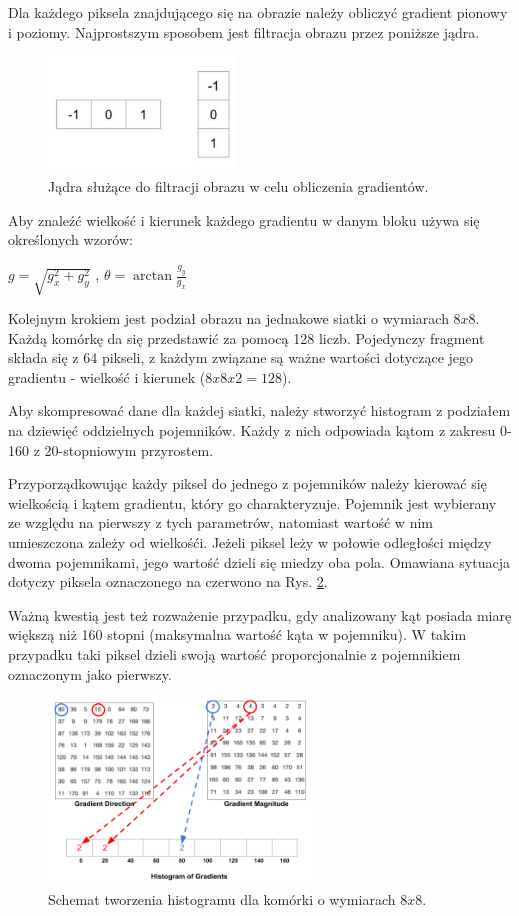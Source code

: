 Dla każdego piksela znajdującego się na obrazie należy obliczyć gradient pionowy i poziomy. Najprostszym sposobem jest filtracja obrazu przez poniższe jądra.

\begin{figure}[h]
	\centering
	\includegraphics[width=5cm]{hog-kernels.jpg}
	\caption{Jądra służące do filtracji obrazu w celu obliczenia gradientów.} 
	\label{fig:hogKernels}
\end{figure}

Aby znaleźć wielkość i kierunek każdego gradientu w danym bloku używa się określonych wzorów:
\begin{center}
    $g=\sqrt{g_{x}^{2}+g_{y}^{2}}$ ,
    $\theta=\arctan \frac{g_{y}}{g_{x}}$
\end{center}

Kolejnym krokiem jest podział obrazu na jednakowe siatki o wymiarach $8x8$. Każdą komórkę da się przedstawić za pomocą 128 liczb. Pojedynczy fragment składa się z 64 pikseli, z każdym związane są ważne wartości dotyczące jego gradientu - wielkość i kierunek ($8x8x2 = 128$). 

Aby skompresować dane dla każdej siatki, należy stworzyć histogram z podziałem na dziewięć oddzielnych pojemników. Każdy z nich odpowiada kątom z zakresu 0-160 z 20-stopniowym przyrostem.

Przyporządkowując każdy piksel do jednego z pojemników należy kierować się wielkością i kątem gradientu, który go charakteryzuje. Pojemnik jest wybierany ze względu na pierwszy z tych parametrów, natomiast wartość w nim umieszczona zależy od wielkośći. Jeżeli piksel leży w połowie odległości między dwoma pojemnikami, jego wartość dzieli się miedzy oba pola. Omawiana sytuacja dotyczy piksela oznaczonego na czerwono na Rys. \ref{fig:gradientHistogram}. 

Ważną kwestią jest też rozważenie przypadku, gdy analizowany kąt posiada miarę większą niż 160 stopni (maksymalna wartość kąta w pojemniku). W takim przypadku taki piksel dzieli swoją wartość proporcjonalnie z pojemnikiem oznaczonym jako pierwszy.

\begin{figure}[h]
	\centering
	\includegraphics[width=7cm]{gradients-histogram.png}
	\caption{Schemat tworzenia histogramu dla komórki o wymiarach $8x8$.} 
	\label{fig:gradientHistogram}
\end{figure}

